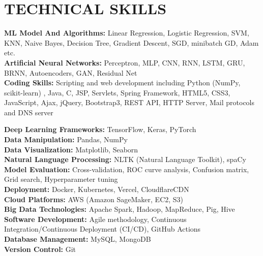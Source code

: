 \documentclass[letterpaper,11pt]{article}
\begin{document}
\section{TECHNICAL SKILLS}
\begin{itemize}[leftmargin=0.15in, label={}]
    \small{
    \item{
        \textbf{ML Model And Algorithms:} Linear Regression, Logistic Regression, SVM, KNN, Naive Bayes, Decision Tree, Gradient Descent, SGD, minibatch GD, Adam etc. \\
        \vspace{0.15cm}
        \textbf{Artificial Neural Networks:} Perceptron, MLP, CNN, RNN, LSTM, GRU, BRNN, Autoencoders, GAN, Residual Net \\
        \vspace{0.15cm}
        \textbf{Coding Skills:} Scripting and web development including Python (NumPy, scikit-learn) , Java, C, JSP, Servlets, Spring Framework, HTML5, CSS3, JavaScript, Ajax, jQuery, Bootstrap3, REST API, HTTP Server, Mail protocols and DNS server \\
        \vspace{0.15cm}

        \textbf{Deep Learning Frameworks:} TensorFlow, Keras, PyTorch \\
        \vspace{0.15cm}
        \textbf{Data Manipulation:} Pandas, NumPy \\
        \vspace{0.15cm}
        \textbf{Data Visualization:} Matplotlib, Seaborn \\
        \vspace{0.15cm}
        \textbf{Natural Language Processing:} NLTK (Natural Language Toolkit), spaCy \\
        \vspace{0.15cm}
        \textbf{Model Evaluation:} Cross-validation, ROC curve analysis, Confusion matrix, Grid search, Hyperparameter tuning \\
        \vspace{0.15cm}
        \textbf{Deployment:} Docker, Kubernetes, Vercel, CloudflareCDN \\
        \vspace{0.15cm}
        \textbf{Cloud Platforms:} AWS (Amazon SageMaker, EC2, S3) \\
        \vspace{0.15cm}
        \textbf{Big Data Technologies:} Apache Spark, Hadoop, MapReduce, Pig, Hive \\
        \vspace{0.15cm}
        \textbf{Software Development:} Agile methodology, Continuous Integration/Continuous Deployment (CI/CD), GitHub Actions \\
        \vspace{0.15cm}
        \textbf{Database Management:} MySQL, MongoDB \\
        \vspace{0.15cm}
        \textbf{Version Control:} Git \\
        \vspace{0.15cm}
    }
    }
\end{itemize}
\end{document}
